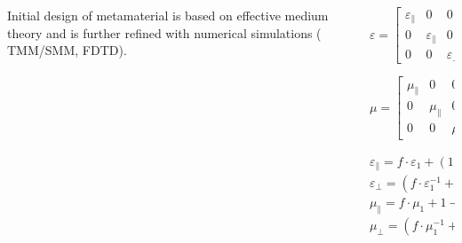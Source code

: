 \documentclass{beamer}
\begin{document}
\begin{frame}
\begin{columns}
\begin{column}{0.5\textwidth}
\begin{figure}[htb]
			\end{figure}
		 	{\tiny Initial design of metamaterial is based on effective medium theory and is further refined with numerical simulations ( TMM/SMM, FDTD).}
		\end{column}
		 \begin{column}{0.5\textwidth}
			\[ \varepsilon= \left[ \begin{array}{ccc}
							\varepsilon_{\parallel} & 0 & 0 \\
							0 & \varepsilon_{\parallel} & 0 \\
							0 & 0 &  \varepsilon_{\perp} \end{array} \right]
			\] 		

			\[ \mu= \left[ \begin{array}{ccc}
							\mu_{\parallel} & 0 & 0 \\
							0 & \mu_{\parallel} & 0 \\
							0 & 0 &  \mu_{\perp} \end{array} \right]
			\] 		

			$\varepsilon_{\parallel}=f\cdot{\varepsilon_1}+(1-f)\cdot \varepsilon_2$\\
			$\varepsilon_{\perp}=\left(f\cdot{\varepsilon_1^{-1}}+(1-f)\cdot \varepsilon_2^{-1}\right)^{-1}$\\
			$\mu_{\parallel}=f\cdot{\mu_1}+{1-f}\cdot \mu_2$\\
			$\mu_{\perp}=\left(f\cdot{\mu_1^{-1}}+(1-f)\cdot \mu_2^{-1}\right)^{-1}$
		\end{column}
	\end{columns}
	{\tiny {\tiny  \cite{PhysRevLett.85.3966}}}
\end{frame}
\end{document}
